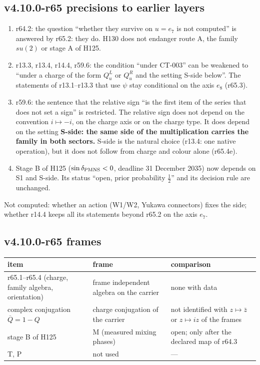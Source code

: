 \subsection*{v4.10.0-r65 precisions to earlier layers}
\label{subsec:v4100-r65-precisions}

\begin{enumerate}[leftmargin=2em]
\item[(a)] r64.2: the question ``whether they survive on \(u=e_7\) is not computed'' is answered by r65.2: they do.  H130 does not endanger route A,
the family \(su(2)\) or stage A of H125.
\item[(b)] r13.3, r13.4, r14.4, r59.6: the condition ``under CT-003'' can be weakened to ``under a charge of the form \(Q^L_u\) or \(Q^R_u\) and the
setting S-side below''.  The statements of r13.1--r13.3 that use \(\psi\) stay conditional on the axis \(e_8\) (r65.3).
\item[(c)] r59.6: the sentence that the relative sign ``is the first item of the series that does not set a sign'' is restricted.  The relative sign
does not depend on the convention \(i\mapsto-i\), on the charge axis or on the charge type.  It does depend on the setting
\textbf{S-side: the same side of the multiplication carries the family in both sectors.}  S-side is the natural choice (r13.4: one native operation), but
it does not follow from charge and colour alone (r65.4e).
\item[(d)] Stage B of H125 (\(\sin\delta_{\rm PMNS}<0\), deadline 31 December 2035) now depends on S1 and S-side.  Its status ``open, prior probability
\(\tfrac12\)'' and its decision rule are unchanged.
\end{enumerate}
Not computed: whether an action (W1/W2, Yukawa connectors) fixes the side; whether r14.4 keeps all its statements beyond r65.2 on the axis \(e_7\).

\subsection*{v4.10.0-r65 frames}
\label{subsec:v4100-r65-frames}

\begin{center}
\small
\begin{tabular}{@{}>{\raggedright\arraybackslash}p{}>{\raggedright\arraybackslash}p{}>{\raggedright\arraybackslash}p{}@{}}
\toprule
item & frame & comparison\\
\midrule
r65.1--r65.4 (charge, family algebra, orientation) & frame independent algebra on the carrier & none with data\\
complex conjugation \(\overline Q=1-Q\) & charge conjugation of the carrier & not identified with \(z\mapsto\bar z\) or \(z\mapsto iz\) of the frames\\
stage B of H125 & M (measured mixing phases) & open; only after the declared map of r64.3\\
T, P & not used & ---\\
\bottomrule
\end{tabular}
\end{center}


